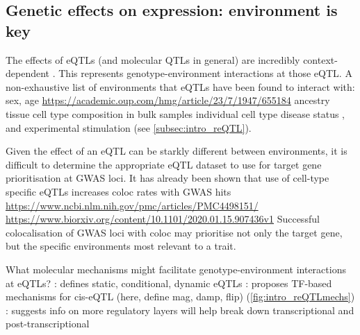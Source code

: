 \begin{outline}
\section{Genetic effects on expression: environment is key}

\1 The effects of \glspl{eQTL} (and molecular \glspl{QTL} in general) are incredibly context-dependent \autocite{albert2015RoleRegulatoryVariation,vandiedonck2017GeneticAssociationMolecular}.
    \2 This represents genotype-environment interactions at those eQTL.
    \2 A non-exhaustive list of environments that \glspl{eQTL} have been found to interact with:
        \3 sex, age \url{https://academic.oup.com/hmg/article/23/7/1947/655184}
        \3 ancestry \autocite{dejager2015ImmVarProjectInsights,nedelec2016GeneticAncestryNatural,quach2017LivingAdaptiveWorld}
        \3 tissue \autocite{nica2011ArchitectureGeneRegulatory,aguet2017GeneticEffectsGene}
        \3 cell type composition in bulk samples \autocite{westra2015CellSpecificEQTL,zhernakova2017IdentificationContextdependentExpression,glastonbury2019CellTypeHeterogeneityAdipose,kim-hellmuth2019CellTypeSpecific}
        \3 individual cell type \autocite{dimas2009CommonRegulatoryVariation,dejager2015ImmVarProjectInsights,peters2016InsightGenotypePhenotypeAssociations,chen2016GeneticDriversEpigenetic,kim-hellmuth2019CellTypeSpecific}
        \3 disease status \autocite{peters2016InsightGenotypePhenotypeAssociations},
        \3 and experimental stimulation (see \autoref{subsec:intro_reQTL}).

\1 Given the effect of an eQTL can be starkly different between environments, it is difficult to determine the appropriate \gls{eQTL} dataset to use for target gene prioritisation at GWAS loci.
\2 It has already been shown that use of cell-type specific eQTLs increases coloc rates with GWAS hits \autocite{kim-hellmuth2019CellTypeSpecific} \url{https://www.ncbi.nlm.nih.gov/pmc/articles/PMC4498151/} \url{https://www.biorxiv.org/content/10.1101/2020.01.15.907436v1}
    \2 Successful colocalisation of GWAS loci with coloc may prioritise not only the target gene, but the specific environments most relevant to a trait.

\1 What molecular mechanisms might facilitate genotype-environment interactions at \glspl{eQTL}?
    \2 \autocite{ackermann2013ImpactNaturalGenetic}: defines static, conditional, dynamic eQTLs
    \2 \textcite{fu2012UnravelingRegulatoryMechanisms}: proposes TF-based mechanisms for cis-eQTL (here, define mag, damp, flip) (\autoref{fig:intro_reQTLmechs})
    \2 \textcite{gaffney2013GlobalPropertiesFunctional,rotival2019CharacterisingGeneticBasis}: suggests info on more regulatory layers will help break down transcriptional and post-transcriptional


\end{outline}
